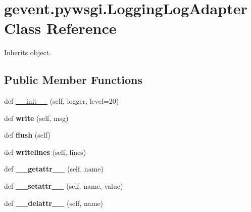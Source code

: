 \hypertarget{classgevent_1_1pywsgi_1_1_logging_log_adapter}{}\section{gevent.\+pywsgi.\+Logging\+Log\+Adapter Class Reference}
\label{classgevent_1_1pywsgi_1_1_logging_log_adapter}


Inherits object.

\subsection*{Public Member Functions}
\begin{DoxyCompactItemize}
\item 
def \hyperlink{classgevent_1_1pywsgi_1_1_logging_log_adapter_add4f028eb6d5379e6d96f8461b92a4d2}{\+\_\+\+\_\+init\+\_\+\+\_\+} (self, logger, level=20)
\item 
\mbox{\label{classgevent_1_1pywsgi_1_1_logging_log_adapter_a53ed5b663acf70b8e575d9a3e0d3ec34}} 
def {\bfseries write} (self, msg)
\item 
\mbox{\label{classgevent_1_1pywsgi_1_1_logging_log_adapter_a3fdc5dad04a44d812dfc368f4f3fe1b0}} 
def {\bfseries flush} (self)
\item 
\mbox{\label{classgevent_1_1pywsgi_1_1_logging_log_adapter_a221ed1cd8c37d5d5522488ff94d5e93a}} 
def {\bfseries writelines} (self, lines)
\item 
\mbox{\label{classgevent_1_1pywsgi_1_1_logging_log_adapter_ad39e475e2c19a4d0f3803fc4966f594b}} 
def {\bfseries \+\_\+\+\_\+getattr\+\_\+\+\_\+} (self, name)
\item 
\mbox{\label{classgevent_1_1pywsgi_1_1_logging_log_adapter_a7a83fcf62bdc85fcea3ebe213e0f3a0d}} 
def {\bfseries \+\_\+\+\_\+setattr\+\_\+\+\_\+} (self, name, value)
\item 
\mbox{\label{classgevent_1_1pywsgi_1_1_logging_log_adapter_a2e0902881917661395edd14683e9800d}} 
def {\bfseries \+\_\+\+\_\+delattr\+\_\+\+\_\+} (self, name)
\end{DoxyCompactItemize}


